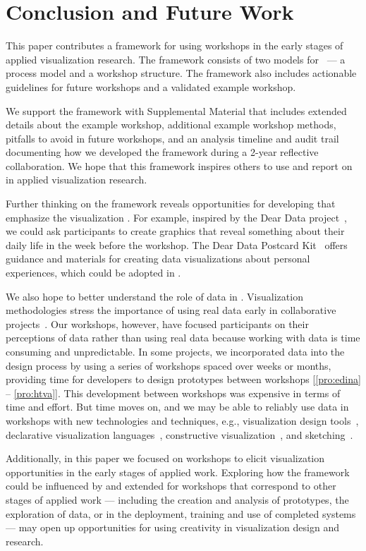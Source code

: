 \section{Conclusion and Future Work} 
\label{sec:conclusion}

This paper contributes a framework for using workshops in the early stages of applied visualization research. The framework consists of two models for \workshops~--- a process model and a workshop structure. The framework also includes \numberOfGuidelines actionable guidelines for future workshops and a validated example workshop. 

We support the framework with Supplemental Material that includes extended details about the example workshop, \numberOfExampleMethods additional example workshop methods, \numberOfPitfalls pitfalls to avoid in future workshops, and an analysis timeline and audit trail documenting how we developed the framework during a 2-year reflective collaboration. We hope that this framework inspires others to use and report on \workshops in applied visualization research.

Further thinking on the framework reveals opportunities for developing \workshop \methods that emphasize the visualization \mindset. For example, inspired by the Dear Data project~\cite{Lupi2016}, we could ask participants to create graphics that reveal something about their daily life in the week before the workshop. The Dear Data Postcard Kit~\cite{Lupi2017} offers guidance and materials for creating data visualizations about personal experiences, which could be adopted in \workshops.

We also hope to better understand the role of data in \workshops. Visualization methodologies stress the importance of using real data early in collaborative projects~\cite{Lloyd2011,Sedlmair2012}. Our workshops, however, have focused participants on their perceptions of data rather than using real data because working with data is time consuming and unpredictable. In some projects, we incorporated data into the design process by using a series of workshops spaced over weeks or months, providing time for developers to design prototypes between workshops [\ref{pro:edina} -- \ref{pro:htva}]. This development between workshops was expensive in terms of time and effort. But time moves on, and we may be able to reliably use data in workshops with new technologies and techniques, e.g., visualization design tools~\cite{Wongsuphasawat2016}, declarative visualization languages~\cite{Satyanarayan2017}, constructive visualization~\cite{Huron2014}, and sketching~\cite{Walny2015}.

Additionally, in this paper we focused on workshops to elicit visualization opportunities in the early stages of applied work. Exploring how the framework could be influenced by and extended for workshops that correspond to other stages of applied work --- including the creation and analysis of prototypes, the exploration of data, or in the deployment, training and use of completed systems --- may open up opportunities for using creativity in visualization design and research.